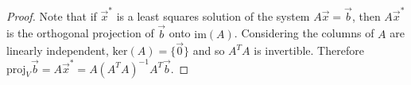 \documentclass[a4paper,8pt]{article}
\begin{document}
\begin{outline}
    \begin{proof}
      Note that if \(\vec{x}^*\) is a least squares solution of the system \(A\vec{x} = \vec{b}\), then \(A\vec{x}^*\) is the orthogonal projection
      of \(\vec{b}\) onto \(\text{im}(A)\). Considering the columns of \(A\) are linearly independent, \(\text{ker}(A) = \{\vec{0}\}\) and so
      \(A^TA\) is invertible. Therefore \(\text{proj}_V\vec{b} = A\vec{x}^* = A(A^TA)^{-1}A^T\vec{b}\).
    \end{proof}

\end{outline}
\end{document}
